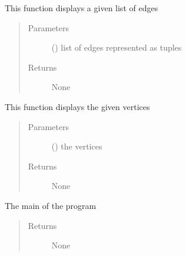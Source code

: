 \documentclass[letterpaper,10pt,english]{sphinxmanual}
\begin{document}
\begin{fulllineitems}
\label{\detokenize{UI:UI.display_edges}}
This function displays a given list of edges
\begin{quote}\begin{description}
\item[{Parameters}] \leavevmode
{} () \textendash{} list of edges represented as tuples

\item[{Returns}] \leavevmode
None

\end{description}\end{quote}

\end{fulllineitems}


\begin{fulllineitems}
\label{\detokenize{UI:UI.display_vertices}}
This function displays the given vertices
\begin{quote}\begin{description}
\item[{Parameters}] \leavevmode
{} () \textendash{} the vertices

\item[{Returns}] \leavevmode
None

\end{description}\end{quote}

\end{fulllineitems}


\begin{fulllineitems}
\label{\detokenize{UI:UI.main}}
The main of the program
\begin{quote}\begin{description}
\item[{Returns}] \leavevmode
None

\end{description}\end{quote}

\end{fulllineitems}
\end{document}
